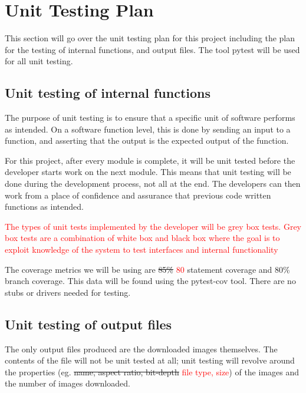 \documentclass[12pt, titlepage]{article}
\begin{document}
\section{Unit Testing Plan}
\label{Unit Testing Plan}

This section will go over the unit testing plan for this project including the plan for the testing of internal functions, and output files. The tool pytest will be used for all unit testing.
		
\subsection{Unit testing of internal functions}

The purpose of unit testing is to ensure that a specific unit of software performs as intended. On a software function level, this is done by sending an input to a function, and asserting that the output is the expected output of the function.

For this project, after every module is complete, it will be unit tested before the developer starts work on the next module. This means that unit testing will be done during the development process, not all at the end. The developers can then work from a place of confidence and assurance that previous code written functions as intended.

\textcolor{red}{The types of unit tests implemented by the developer will be grey box tests. Grey box tests are a
combination of white box and black box where the goal is to exploit knowledge of the system to test interfaces and 
internal functionality}

The coverage metrics we will be using are \sout{85\%} \textcolor{red}{80} statement coverage and 
80\% branch coverage. This data will be found using the pytest-cov tool. There are no stubs 
or drivers needed for testing.
		
\subsection{Unit testing of output files}

The only output files produced are the downloaded images themselves. The contents of the file will not be unit 
tested at all; unit testing will revolve around the properties (eg. \sout{name, aspect ratio, bit-depth} \textcolor{red}{
file type, size}) of the images and the number of images downloaded.

%
\end{document}

